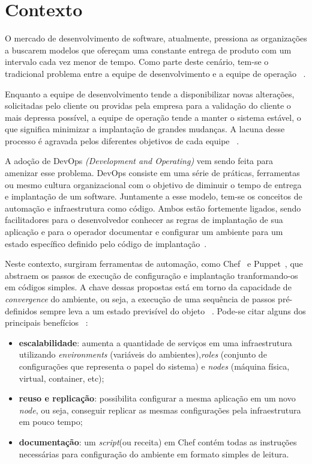 \section*{Contexto}
\label{sec:contexto}

O mercado de desenvolvimento de software, atualmente, pressiona as organizações
a buscarem modelos que ofereçam uma constante entrega de produto com
um intervalo cada vez menor de tempo. Como parte deste cenário, tem-se o
tradicional problema entre a equipe de desenvolvimento e a equipe de operação
~\cite{hummer:2013}.

Enquanto a equipe de desenvolvimento tende a disponibilizar novas alterações,
solicitadas pelo cliente ou providas pela empresa para a validação do cliente o
mais depressa possível, a equipe de operação tende a manter o sistema estável,
o que significa minimizar a implantação de grandes mudanças. A lacuna desse
processo é agravada pelos diferentes objetivos de cada equipe
~\cite{huttermann:2012}.

A adoção de DevOps \textit{(Development and Operating)} vem sendo feita
para amenizar esse problema. DevOps consiste em uma série de práticas,
ferramentas ou mesmo cultura organizacional com o objetivo de diminuir o tempo
de entrega e implantação de um software. Juntamente a esse modelo,
tem-se os conceitos de automação e infraestrutura
como código. Ambos estão fortemente ligados, sendo facilitadores para o
desenvolvedor conhecer as regras de implantação de sua aplicação
e para o operador documentar e configurar um ambiente para um estado específico
definido pelo código de implantação~\cite{hummer:2013}.

Neste contexto, surgiram ferramentas de automação, como Chef~\cite{chef:2016} e
Puppet~\cite{puppet:2016}, que abstraem os passos de execução de configuração
e implantação tranformando-os em códigos simples. A chave dessas propostas está em torno
da capacidade de \textit{convergence} do ambiente, ou seja, a execução de uma
sequência de passos pré-definidos sempre leva a um estado previsível do objeto
~\cite{hummer:2013}. Pode-se citar alguns dos principais benefícios
~\cite{vasiliev:2014}:

\begin{itemize}
  \item \textbf{escalabilidade}: aumenta a quantidade de serviços em uma infraestrutura
    utilizando \textit{environments} (variáveis do ambientes),\textit{roles}
    (conjunto de configurações que representa o papel do sistema) e \textit{nodes}
    (máquina física, virtual, container, etc);
  \item \textbf{reuso e replicação}: possibilita configurar a mesma aplicação em um novo \textit{node}, ou seja,
    conseguir replicar as mesmas configurações pela infraestrutura em pouco tempo;
  \item \textbf{documentação}: um \textit{script}(ou receita) em Chef contém todas as instruções necessárias
    para configuração do ambiente em formato simples de leitura.
\end{itemize}

